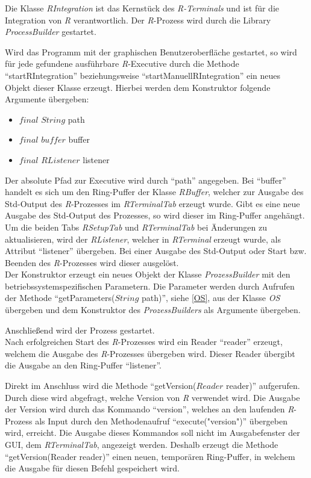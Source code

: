 \documentclass[a4paper, 12pt]{report} %
\begin{document}
Die Klasse \textit{RIntegration} ist das Kernstück des \textit{R-Terminals} und ist für die Integration von \textit{R} verantwortlich. Der \textit{R}-Prozess wird durch die Library \textit{ProcessBuilder} \cite{processBuilder} gestartet.

Wird das Programm mit der graphischen Benutzeroberfläche gestartet, so wird für jede gefundene ausführbare \textit{R}-Executive durch die Methode "`startRIntegration"' beziehungsweise "`startManuellRIntegration"' ein neues Objekt dieser Klasse erzeugt.
Hierbei werden dem Konstruktor folgende Argumente übergeben:
\begin{itemize}
	\item $final$ $String$ path
	\item $final$ $buffer$ buffer 
	\item $final$ $RListener$ listener
\end{itemize}
%
Der absolute Pfad zur Executive wird durch "`path"' angegeben. Bei "`buffer"' handelt es sich um den Ring-Puffer der Klasse \textit{RBuffer}, welcher zur Ausgabe des Std-Output des \textit{R}-Prozesses im \textit{RTerminalTab} erzeugt wurde. Gibt es eine neue Ausgabe des Std-Output des Prozesses, so wird dieser im Ring-Puffer angehängt. 
Um die beiden Tabs \textit{RSetupTab} und \textit{RTerminalTab} bei Änderungen zu aktualisieren, wird der \textit{RListener}, welcher in \textit{RTerminal} erzeugt wurde, als Attribut "`listener"' übergeben.
Bei einer Ausgabe des Std-Output oder Start bzw. Beenden des \textit{R}-Prozesses wird dieser ausgelöst.\\

Der Konstruktor erzeugt ein neues Objekt der Klasse \textit{ProzessBuilder} mit den betriebssystemspezifischen Parametern. Die Parameter werden durch Aufrufen der Methode "`getParameters($String$ path)"', siehe \ref{OS}, aus der Klasse \textit{OS} übergeben und dem Konstruktor des \textit{ProzessBuilders} als Argumente übergeben.

Anschließend wird der Prozess gestartet.\\

Nach erfolgreichen Start des \textit{R}-Prozesses wird ein Reader "`reader"' erzeugt, welchem die Ausgabe des \textit{R}-Prozesses übergeben wird. Dieser Reader übergibt die Ausgabe an den Ring-Puffer "`listener"'.

Direkt im Anschluss wird die Methode "`getVersion($Reader$ reader)"' aufgerufen. Durch diese wird abgefragt, welche Version von \textit{R} verwendet wird.
Die Ausgabe der Version wird durch das Kommando "`version"', welches an den laufenden \textit{R}-Prozess als Input durch den Methodenaufruf "`execute("version")"' übergeben wird, erreicht. Die Ausgabe dieses Kommandos soll nicht im Ausgabefenster der GUI, dem \textit{RTerminalTab}, angezeigt werden. Deshalb erzeugt die Methode "`getVersion(Reader reader)"' einen neuen, temporären Ring-Puffer, in welchem die Ausgabe für diesen Befehl gespeichert wird. 
\end{document}
